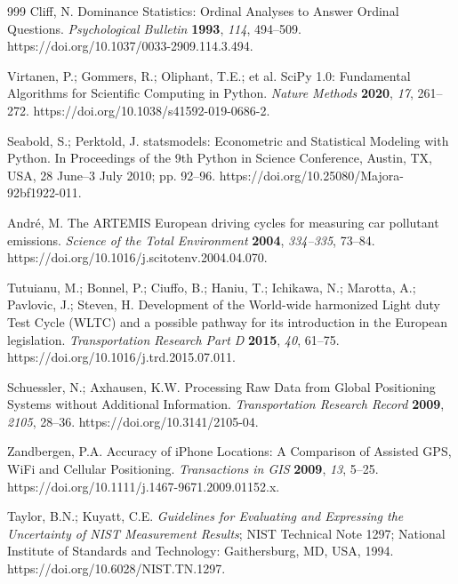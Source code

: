 \documentclass[vehicles,article,submit,moreauthors]{Definitions/mdpi}
\begin{document}
\begin{thebibliography}{999}
    Cliff, N. Dominance Statistics: Ordinal Analyses to Answer Ordinal Questions. \textit{Psychological Bulletin} \textbf{1993}, \textit{114}, 494--509. https://doi.org/10.1037/0033-2909.114.3.494.

    Virtanen, P.; Gommers, R.; Oliphant, T.E.; et al. SciPy 1.0: Fundamental Algorithms for Scientific Computing in Python. \textit{Nature Methods} \textbf{2020}, \textit{17}, 261--272. https://doi.org/10.1038/s41592-019-0686-2.

    Seabold, S.; Perktold, J. statsmodels: Econometric and Statistical Modeling with Python. In Proceedings of the 9th Python in Science Conference, Austin, TX, USA, 28 June--3 July 2010; pp. 92--96. https://doi.org/10.25080/Majora-92bf1922-011.

    André, M. The ARTEMIS European driving cycles for measuring car pollutant emissions. \textit{Science of the Total Environment} \textbf{2004}, \textit{334--335}, 73--84. https://doi.org/10.1016/j.scitotenv.2004.04.070.

    Tutuianu, M.; Bonnel, P.; Ciuffo, B.; Haniu, T.; Ichikawa, N.; Marotta, A.; Pavlovic, J.; Steven, H. Development of the World-wide harmonized Light duty Test Cycle (WLTC) and a possible pathway for its introduction in the European legislation. \textit{Transportation Research Part D} \textbf{2015}, \textit{40}, 61--75. https://doi.org/10.1016/j.trd.2015.07.011.

    Schuessler, N.; Axhausen, K.W. Processing Raw Data from Global Positioning Systems without Additional Information. \textit{Transportation Research Record} \textbf{2009}, \textit{2105}, 28--36. https://doi.org/10.3141/2105-04.

    Zandbergen, P.A. Accuracy of iPhone Locations: A Comparison of Assisted GPS, WiFi and Cellular Positioning. \textit{Transactions in GIS} \textbf{2009}, \textit{13}, 5--25. https://doi.org/10.1111/j.1467-9671.2009.01152.x.

    Taylor, B.N.; Kuyatt, C.E. \textit{Guidelines for Evaluating and Expressing the Uncertainty of NIST Measurement Results}; NIST Technical Note 1297; National Institute of Standards and Technology: Gaithersburg, MD, USA, 1994. https://doi.org/10.6028/NIST.TN.1297.


\end{thebibliography}
\end{document}
